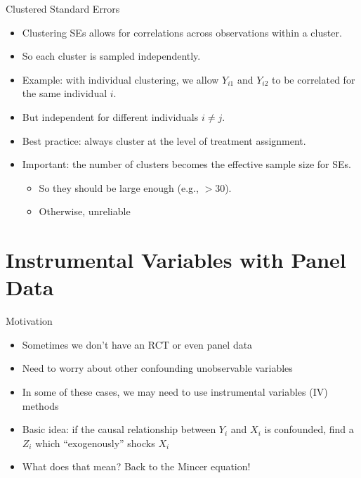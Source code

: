 \documentclass[11pt,notes=hide,aspectratio=169,mathserif]{beamer}
\begin{document}
\begin{frame}{Clustered Standard Errors}
\begin{itemize}
  \item Clustering SEs allows for correlations across observations within a cluster.
  \item So each cluster is sampled independently. 
  \item Example: with individual clustering, we allow $Y_{i1}$ and $Y_{i2}$ to be correlated for the same individual $i$.
  \item But independent for different individuals $i \neq j$.
 \item Best practice: always cluster at the level of treatment assignment.
 \item Important: the number of clusters becomes the effective sample size for SEs.
 \begin{itemize}
  \item So they should be large enough (e.g., $> 30$).
  \item Otherwise, unreliable 
\end{itemize}
\end{itemize}
\end{frame}

\section{Instrumental Variables with Panel Data}
\begin{frame}{Motivation}
\begin{itemize}
  \item Sometimes we don't have an RCT or even panel data
  \item Need to worry about other confounding unobservable variables
  \item In some of these cases, we may need to use instrumental variables (IV) methods
  \item Basic idea: if the causal relationship between $Y_i$ and $X_i$
  is confounded, find a $Z_i$ which “exogenously” shocks $X_i$
  \item What does that mean? Back to the Mincer equation!
\end{itemize}
\end{frame}
\end{document}
